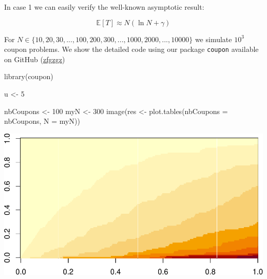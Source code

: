\documentclass[
]{article}
\newenvironment{Shaded}{\begin{snugshade}}{\end{snugshade}}
\newcommand{\AttributeTok}[1]{\textcolor[rgb]{0.77,0.63,0.00}{#1}}
\newcommand{\DecValTok}[1]{\textcolor[rgb]{0.00,0.00,0.81}{#1}}
\newcommand{\FunctionTok}[1]{\textcolor[rgb]{0.00,0.00,0.00}{#1}}
\newcommand{\NormalTok}[1]{#1}
\newcommand{\OtherTok}[1]{\textcolor[rgb]{0.56,0.35,0.01}{#1}}
\begin{document}
In case 1 we can easily verify the well-known asymptotic result:

\[\mathbb E [T] \approx N(\ln N + \gamma)\]

For \(N \in \{10,20,30,...,100,200,300,...,1000,2000,...,10000\}\) we
simulate \(10^3\) coupon problems. We show the detailed code using our
package \texttt{coupon} available on GitHub (\url{zfgzgz})

\begin{Shaded}
\begin{Highlighting}[]
\FunctionTok{library}\NormalTok{(coupon)}

\NormalTok{u }\OtherTok{\textless{}{-}} \DecValTok{5}

\NormalTok{nbCoupons }\OtherTok{\textless{}{-}} \DecValTok{100}
\NormalTok{myN }\OtherTok{\textless{}{-}} \DecValTok{300}
\FunctionTok{image}\NormalTok{(res }\OtherTok{\textless{}{-}} \FunctionTok{plot.tables}\NormalTok{(}\AttributeTok{nbCoupons =}\NormalTok{ nbCoupons, }\AttributeTok{N =}\NormalTok{ myN))}
\end{Highlighting}
\end{Shaded}

\includegraphics{examples_files/figure-latex/unnamed-chunk-2-1.pdf}
\end{document}
